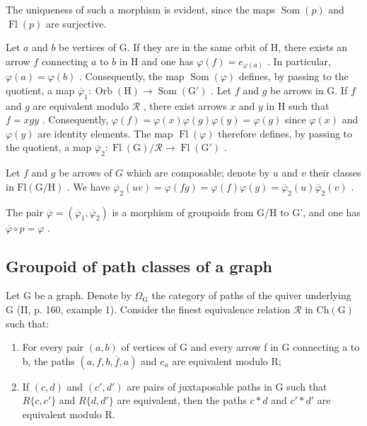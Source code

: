 The uniqueness of such a morphism is evident, since the maps \(\operatorname{Som}(p)\) and \(\operatorname{Fl}(p)\) are surjective.

Let \(a\) and \(b\) be vertices of G. If they are in the same orbit of H, there exists an arrow \(f\) connecting \(a\) to \(b\) in H and one has \(\varphi(f) = e_{\varphi(a)}\) . In particular, \(\varphi(a) = \varphi(b)\) . Consequently, the map \(\operatorname{Som}(\varphi)\) defines, by passing to the quotient, a map \(\overline{\varphi}_1\colon \operatorname{Orb}(\mathrm{H}) \to \operatorname{Som}(\mathrm{G}')\) . Let \(f\) and \(g\) be arrows in G. If \(f\) and \(g\) are equivalent modulo \(\mathcal{R}\) , there exist arrows \(x\) and \(y\) in H such that \(f = xgy\) . Consequently, \(\varphi(f) = \varphi(x)\varphi(g)\varphi(y) = \varphi(g)\) since \(\varphi(x)\) and \(\varphi(y)\) are identity elements. The map \(\operatorname{Fl}(\varphi)\) therefore defines, by passing to the quotient, a map \(\overline{\varphi}_2\colon \operatorname{Fl}(\mathrm{G}) / \mathcal{R} \to \operatorname{Fl}(\mathrm{G}')\) .

Let \(f\) and \(g\) be arrows of \(G\) which are composable; denote by \(u\) and \(v\) their classes in \(\mathrm{Fl}(\mathrm{G} / \mathrm{H})\) . We have \(\overline{\varphi}_2(uv) = \varphi(fg) = \varphi(f)\varphi(g) = \overline{\varphi}_2(u)\overline{\varphi}_2(v)\) .

The pair \(\overline{\varphi} = (\overline{\varphi}_1, \overline{\varphi}_2)\) is a morphism of groupoids from G/H to G', and one has \(\overline{\varphi} \circ p = \varphi\) .

\subsection{Groupoid of path classes of a graph}

Let G be a graph. Denote by \(\Omega_{\mathrm{G}}\) the category of paths of the quiver underlying G (II, p. 160, example 1). Consider the finest equivalence relation \(\mathcal{R}\) in \(\mathrm{Ch(G)}\) such that:

\begin{enumerate}
\def\labelenumi{(\roman{enumi})}
\item
  For every pair \((a,b)\) of vertices of G and every arrow f in G connecting a to b, the paths \((a,f,b,\overline{f},a)\) and \(e_{a}\) are equivalent modulo R;
\item
  If \((c,d)\) and \((c',d')\) are pairs of juxtaposable paths in G such that \(R\{c,c'\}\) and \(R\{d,d'\}\) are equivalent, then the paths \(c*d\) and \(c'*d'\) are equivalent modulo R.
\end{enumerate}

